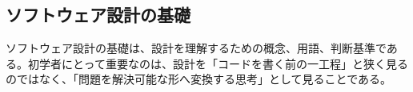 \subsection{ソフトウェア設計の基礎}

ソフトウェア設計の基礎は、設計を理解するための概念、用語、判断基準である。初学者にとって重要なのは、設計を「コードを書く前の一工程」と狭く見るのではなく、「問題を解決可能な形へ変換する思考」として見ることである。
